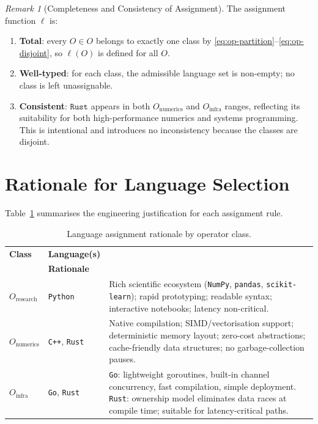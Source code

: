 \documentclass[12pt,openany]{book}
\numberwithin{equation}{chapter}
\theoremstyle{plain}
\theoremstyle{definition}
\theoremstyle{remark}
\newtheorem{remark}[theorem]{Remark}
\numberwithin{equation}{chapter}
\theoremstyle{plain}
\renewcommand{\arraystretch}{1.2}
\newcommand{\calO}{\mathcal{O}}
\def\calO{O}%
\begin{document}
\begin{remark}[Completeness and Consistency of Assignment]
\label{rem:lang-complete}
The assignment function $\ell$ is:
\begin{enumerate}
  \item \textbf{Total}: every $O \in \calO$ belongs to exactly one
        class by \eqref{eq:op-partition}--\eqref{eq:op-disjoint},
        so $\ell(O)$ is defined for all $O$.
  \item \textbf{Well-typed}: for each class, the admissible language
        set is non-empty; no class is left unassignable.
  \item \textbf{Consistent}: $\texttt{Rust}$ appears in both
        $\calO_{\text{numerics}}$ and $\calO_{\text{infra}}$ ranges,
        reflecting its suitability for both high-performance numerics
        and systems programming.  This is intentional and introduces
        no inconsistency because the classes are disjoint.
\end{enumerate}
\end{remark}

\section{Rationale for Language Selection}
\label{sec:lang-rationale}

\noindent
Table~\ref{tab:lang-rationale} summarises the engineering justification
for each assignment rule.

\begin{table}[htbp]
\centering
\caption{Language assignment rationale by operator class.}
\label{tab:lang-rationale}
\renewcommand{\arraystretch}{1.35}
\begin{tabular}{p{2.8cm} p{2.2cm} p{7.5cm}}
\hline
\textbf{Class} & \textbf{Language(s)} \\ & \textbf{Rationale} \\
\hline
$\calO_{\text{research}}$
  & \texttt{Python}
  & Rich scientific ecosystem (\texttt{NumPy}, \texttt{pandas},
    \texttt{scikit-learn}); rapid prototyping; readable syntax;
    interactive notebooks; latency non-critical. \\[2pt]
$\calO_{\text{numerics}}$
  & \texttt{C++}, \texttt{Rust}
  & Native compilation; SIMD/vectorisation support; deterministic
    memory layout; zero-cost abstractions; cache-friendly data
    structures; no garbage-collection pauses. \\[2pt]
$\calO_{\text{infra}}$
  & \texttt{Go}, \texttt{Rust}
  & \texttt{Go}: lightweight goroutines, built-in channel
    concurrency, fast compilation, simple deployment.
    \texttt{Rust}: ownership model eliminates data races at
    compile time; suitable for latency-critical paths. \\
\hline
\end{tabular}
\end{table}
\end{document}
